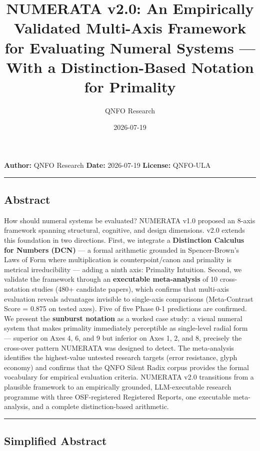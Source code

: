 \documentclass[
]{article}
\title{NUMERATA v2.0: An Empirically Validated Multi-Axis Framework for
Evaluating Numeral Systems --- With a Distinction-Based Notation for
Primality}
\author{QNFO Research}
\date{2026-07-19}
\begin{document}
\maketitle

\textbf{Author:} QNFO Research \textbar{} \textbf{Date:} 2026-07-19
\textbar{} \textbf{License:} QNFO-ULA

\begin{center}\rule{0.5\linewidth}{0.5pt}\end{center}

\subsection{Abstract}\label{abstract}

How should numeral systems be evaluated? NUMERATA v1.0 proposed an
8-axis framework spanning structural, cognitive, and design dimensions.
v2.0 extends this foundation in two directions. First, we integrate a
\textbf{Distinction Calculus for Numbers (DCN)} --- a formal arithmetic
grounded in Spencer-Brown's Laws of Form where multiplication is
counterpoint/canon and primality is metrical irreducibility --- adding a
ninth axis: Primality Intuition. Second, we validate the framework
through an \textbf{executable meta-analysis} of 10 cross-notation
studies (480+ candidate papers), which confirms that multi-axis
evaluation reveals advantages invisible to single-axis comparisons
(Meta-Contrast Score = 0.875 on tested axes). Five of five Phase 0-1
predictions are confirmed. We present the \textbf{sunburst notation} as
a worked case study: a visual numeral system that makes primality
immediately perceptible as single-level radial form --- superior on Axes
4, 6, and 9 but inferior on Axes 1, 2, and 8, precisely the cross-over
pattern NUMERATA was designed to detect. The meta-analysis identifies
the highest-value untested research targets (error resistance, glyph
economy) and confirms that the QNFO Silent Radix corpus provides the
formal vocabulary for empirical evaluation criteria. NUMERATA v2.0
transitions from a plausible framework to an empirically grounded,
LLM-executable research programme with three OSF-registered Registered
Reports, one executable meta-analysis, and a complete distinction-based
arithmetic.

\begin{center}\rule{0.5\linewidth}{0.5pt}\end{center}

\subsection{Simplified Abstract}\label{simplified-abstract}
\end{document}
